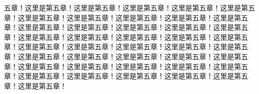 五章！这里是第五章！这里是第五章！这里是第五章！这里是第五章！这里是第五章！这里是第五章！这里是第五章！这里是第五章！这里是第五章！这里是第五章！这里是第五章！这里是第五章！这里是第五章！这里是第五章！这里是第五章！这里是第五章！这里是第五章！这里是第五章！这里是第五章！这里是第五章！这里是第五章！这里是第五章！这里是第五章！这里是第五章！这里是第五章！这里是第五章！这里是第五章！这里是第五章！这里是第五章！这里是第五章！这里是第五章！这里是第五章！这里是第五章！这里是第五章！这里是第五章！这里是第五章！这里是第五章！这里是第五章！这里是第五章！这里是第五章！这里是第五章！

